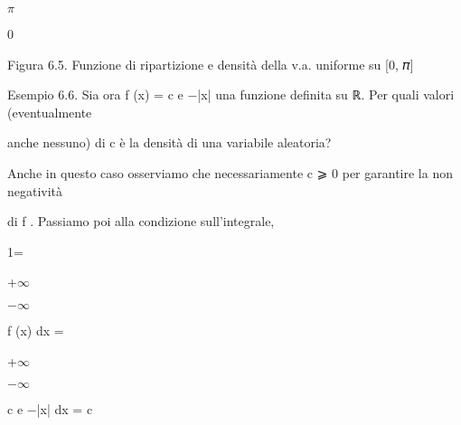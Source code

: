 \documentclass[a4paper,portrait,12pt]{article}
\begin{document}
\begin{flushleft}
$\pi$
\end{flushleft}





0





\begin{flushleft}
Figura 6.5. Funzione di ripartizione e densit\`{a} della v.a. uniforme su [0, 𝜋]
\end{flushleft}





\begin{flushleft}
Esempio 6.6. Sia ora f (x) = c e $-$|x| una funzione definita su ℝ. Per quali valori (eventualmente
\end{flushleft}


\begin{flushleft}
anche nessuno) di c \`{e} la densit\`{a} di una variabile aleatoria?
\end{flushleft}


\begin{flushleft}
Anche in questo caso osserviamo che necessariamente c ⩾ 0 per garantire la non negativit\`{a}
\end{flushleft}


\begin{flushleft}
di f . Passiamo poi alla condizione sull'integrale,
\end{flushleft}


1=





+$\infty$


$-$$\infty$





\begin{flushleft}
f (x) dx =
\end{flushleft}





+$\infty$


$-$$\infty$





\begin{flushleft}
c e $-$|x| dx = c
\end{flushleft}
\end{document}
